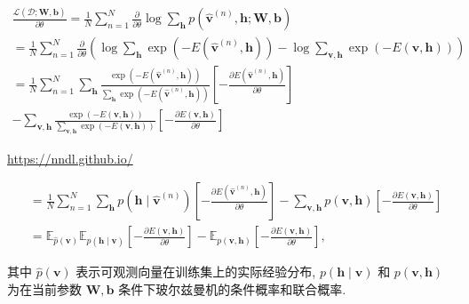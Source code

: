 \documentclass[10pt]{article}
\begin{document}
\begin{align*}
\frac{\mathcal{L}(\mathcal{D} ; \boldsymbol{W}, \boldsymbol{b})}{\partial \theta}=\frac{1}{N} \sum_{n=1}^{N} \frac{\partial}{\partial \theta} \log \sum_{\boldsymbol{h}} p\left(\hat{\boldsymbol{v}}^{(n)}, \boldsymbol{h} ; \boldsymbol{W}, \boldsymbol{b}\right)  \tag{12.19}\\
=\frac{1}{N} \sum_{n=1}^{N} \frac{\partial}{\partial \theta}\left(\log \sum_{\boldsymbol{h}} \exp \left(-E\left(\hat{\boldsymbol{v}}^{(n)}, \boldsymbol{h}\right)\right)-\log \sum_{\boldsymbol{v}, \boldsymbol{h}} \exp (-E(\boldsymbol{v}, \boldsymbol{h}))\right)  \tag{12.20}\\
=\frac{1}{N} \sum_{n=1}^{N} \sum_{\boldsymbol{h}} \frac{\exp \left(-E\left(\hat{\boldsymbol{v}}^{(n)}, \boldsymbol{h}\right)\right)}{\sum_{\boldsymbol{h}} \exp \left(-E\left(\hat{\boldsymbol{v}}^{(n)}, \boldsymbol{h}\right)\right)}\left[-\frac{\partial E\left(\hat{\boldsymbol{v}}^{(n)}, \boldsymbol{h}\right)}{\partial \theta}\right] \\
-\sum_{\boldsymbol{v}, \boldsymbol{h}} \frac{\exp (-E(\boldsymbol{v}, \boldsymbol{h}))}{\sum_{\boldsymbol{v}, \boldsymbol{h}} \exp (-E(\boldsymbol{v}, \boldsymbol{h}))}\left[-\frac{\partial E(\boldsymbol{v}, \boldsymbol{h})}{\partial \theta}\right] \tag{12.21}
\end{align*}


\href{https://nndl.github.io/}{https://nndl.github.io/}


\begin{align*}
& =\frac{1}{N} \sum_{n=1}^{N} \sum_{\boldsymbol{h}} p\left(\boldsymbol{h} \mid \hat{\boldsymbol{v}}^{(n)}\right)\left[-\frac{\partial E\left(\hat{\boldsymbol{v}}^{(n)}, \boldsymbol{h}\right)}{\partial \theta}\right]-\sum_{\boldsymbol{v}, \boldsymbol{h}} p(\boldsymbol{v}, \boldsymbol{h})\left[-\frac{\partial E(\boldsymbol{v}, \boldsymbol{h})}{\partial \theta}\right]  \tag{12.22}\\
& =\mathbb{E}_{\hat{p}(\boldsymbol{v})} \mathbb{E}_{p(\boldsymbol{h} \mid \boldsymbol{v})}\left[-\frac{\partial E(\boldsymbol{v}, \boldsymbol{h})}{\partial \theta}\right]-\mathbb{E}_{p(\boldsymbol{v}, \boldsymbol{h})}\left[-\frac{\partial E(\boldsymbol{v}, \boldsymbol{h})}{\partial \theta}\right], \tag{12.23}
\end{align*}


其中 $\hat{p}(\boldsymbol{v})$ 表示可观测向量在训练集上的实际经验分布, $p(\boldsymbol{h} \mid \boldsymbol{v})$ 和 $p(\boldsymbol{v}, \boldsymbol{h})$ 为在当前参数 $\boldsymbol{W}, \boldsymbol{b}$ 条件下玻尔兹曼机的条件概率和联合概率.
\end{document}

